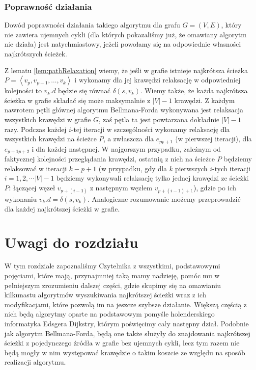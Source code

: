 \subsubsection{Poprawność działania}

Dowód poprawności działania takiego algorytmu dla grafu $G = \left( V, E \right)$, który nie zawiera ujemnych cykli (dla których pokazaliśmy już, że omawiany algorytm nie działa) jest natychmiastowy, jeżeli powołamy się na odpowiednie własności najkrótszych ścieżek.

Z lematu \ref{lem:pathRelaxation} wiemy, że jeśli w grafie istnieje najkrótsza ścieżka $P = \left \langle v_{p}, v_{p+1}, \ldots, v_{k} \right \rangle $ i wykonamy dla jej krawędzi relaksację w odpowiedniej kolejności to $v_{k}.d$ będzie się równać $ \delta \left( s, v_{k} \right)$. Wiemy także, że każda najkrótsza ścieżka w grafie składać się może maksymalnie z $ \left| V \right| - 1 $ krawędzi. Z każdym nawrotem pętli głównej algorytmu Bellmana-Forda wykonywana jest relaksacja wszystkich krawędzi w grafie $G$, zaś pętla ta jest powtarzana dokładnie $ \left| V \right| - 1 $ razy. Podczas każdej $i$-tej iteracji w szczególności wykonamy relaksację dla wszystkich krawędzi na ścieżce $P$, a zwłaszcza dla $e_{pp+1}$ (w pierwszej iteracji), dla $e_{p+1p+2}$ i dla każdej następnej. W najgorszym przypadku, zależnym od faktycznej kolejności przeglądania krawędzi, ostatnią z nich na ścieżce $P$ będziemy relaksować w iteracji $k-p+1$ (w przypadku, gdy dla $k$ pierwszych $i$-tych iteracji $i = 1, 2, \cdots \left| V \right| - 1$ będziemy wykonywali relaksację tylko jednej krawędzi ze ścieżki $P$: łączącej węzeł $v_{p+ \left( i-1 \right)}$ z następnym węzłem $v_{p+ \left( i-1 \right) + 1}$), gdzie po ich wykonaniu $v_{k}.d = \delta \left( s, v_{k} \right)$. Analogiczne rozumowanie możemy przeprowadzić dla każdej najkrótszej ścieżki w grafie.

\section{Uwagi do rozdziału}

W tym rozdziale zapoznaliśmy Czytelnika z wszystkimi, podstawowymi pojęciami, które mają, przynajmniej taką mamy nadzieję, pomóc mu w pełniejszym zrozumieniu dalszej części, gdzie skupimy się na omawianiu kilkunastu algorytmów wyszukiwania najkrótszej ścieżki wraz z ich modyfikacjami, które pozwolą im na jeszcze szybsze działanie. Większą częścią z nich będą algorytmy oparte na podstawowym pomyśle holenderskiego informatyka Edsgera Dijkstry, którym poświęcimy cały następny dział. Podobnie jak algorytm Bellmana-Forda, będą one także służyły do znajdowania najkrótszej ścieżki z pojedynczego źródła w grafie bez ujemnych cykli, lecz tym razem nie będą mogły w nim występować krawędzie o takim koszcie ze względu na sposób realizacji algorytmu.